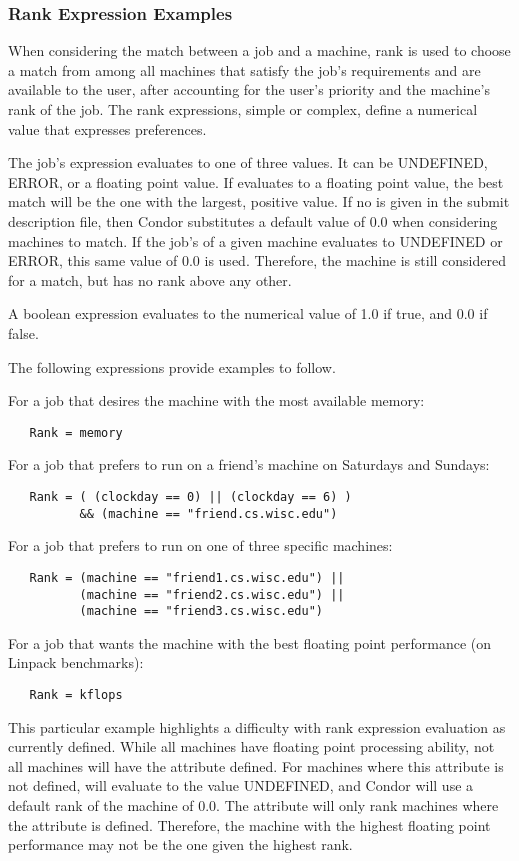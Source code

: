 \subsubsection{\label{rank-examples}Rank Expression Examples}

When considering the match between a job and a machine, rank is used
to choose a match from among all machines that satisfy the job's
requirements and are available to the user, after accounting for
the user's priority and the machine's rank of the job.
The rank expressions, simple or complex, define a numerical value
that expresses preferences.

The job's  expression evaluates to one of three values.
It can be UNDEFINED, ERROR, or a floating point value.
If  evaluates to a floating point value,
the best match will be the one with the largest, positive value.
If no  is given 
in the submit description file,
then Condor substitutes a default value of 0.0 when considering
machines to match.
If the job's  of a given machine evaluates
to UNDEFINED or ERROR,
this same value of 0.0 is used.
Therefore, the machine is still considered for a match,
but has no rank above any other.

A boolean expression evaluates to the numerical value of 1.0
if true, and 0.0 if false.

The following  expressions provide examples to
follow.

For a job that desires the machine with the most available memory:
\begin{verbatim}
   Rank = memory
\end{verbatim}

For a job that prefers to run on a friend's machine
on Saturdays and Sundays:
\begin{verbatim}
   Rank = ( (clockday == 0) || (clockday == 6) )
          && (machine == "friend.cs.wisc.edu")
\end{verbatim}

For a job that prefers to run on one of three specific machines:
\begin{verbatim}
   Rank = (machine == "friend1.cs.wisc.edu") ||
          (machine == "friend2.cs.wisc.edu") ||
          (machine == "friend3.cs.wisc.edu")
\end{verbatim}

For a job that wants the machine with the best floating point
performance (on Linpack benchmarks):
\begin{verbatim}
   Rank = kflops
\end{verbatim}
This particular example highlights a difficulty with rank expression
evaluation as currently defined.
While all machines have floating point processing ability,
not all machines will have the  attribute defined.
For machines where this attribute is not defined,
 will evaluate to the value UNDEFINED, and
Condor will use a default rank of the machine of 0.0.
The  attribute will only rank machines where
the attribute is defined.
Therefore, the machine with the highest floating point
performance may not be the one given the highest rank.


